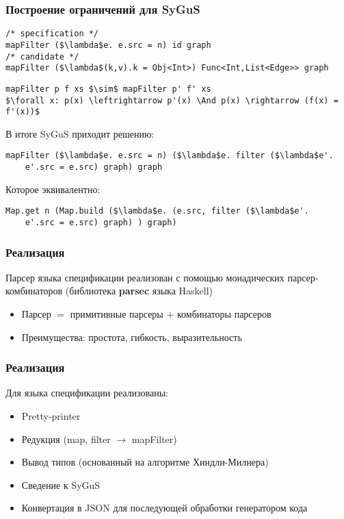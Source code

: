 \documentclass[14pt]{beamer}
\begin{document}
\begin{frame}[fragile]
\frametitle{Построение ограничений для SyGuS}

\begin{lstlisting}[language=SyGuSLang, mathescape=true]
/* specification */
mapFilter ($\lambda$e. e.src = n) id graph
/* candidate */
mapFilter ($\lambda$(k,v).k = Obj<Int>) Func<Int,List<Edge>> graph
\end{lstlisting}


\begin{lstlisting}[language=SyGuSLang, mathescape=true]
mapFilter p f xs $\sim$ mapFilter p' f' xs
$\forall x: p(x) \leftrightarrow p'(x) \And p(x) \rightarrow (f(x) = f'(x))$
\end{lstlisting}

В итоге SyGuS приходит решению:
\begin{lstlisting}[language=SyGuSLang, mathescape=true]
mapFilter ($\lambda$e. e.src = n) ($\lambda$e. filter ($\lambda$e'.
    e'.src = e.src) graph) graph
\end{lstlisting}

Которое эквивалентно:
\begin{lstlisting}[language=SolutionLang, mathescape=true]
Map.get n (Map.build ($\lambda$e. (e.src, filter ($\lambda$e'.
    e'.src = e.src) graph) ) graph)
\end{lstlisting}
\end{frame}



\begin{frame}
\frametitle{Реализация}
Парсер языка спецификации реализован с помощью монадических парсер-комбинаторов (библиотека \textbf{parsec} языка Haskell)
\begin{itemize}
    \item Парсер $=$ примитивные парсеры $+$ комбинаторы парсеров
    \item Преимущества: простота, гибкость, выразительность
\end{itemize}
\end{frame}


\begin{frame}
\frametitle{Реализация}
Для языка спецификации реализованы:
\begin{itemize}
    \item Pretty-printer
    \item Редукция (map, filter $\to$ mapFilter)
    \item Вывод типов (основанный на алгоритме Хиндли-Милнера)
    \item Сведение к SyGuS
    \item Конвертация в JSON для последующей обработки генератором кода
\end{itemize}
\end{frame}
\end{document}
